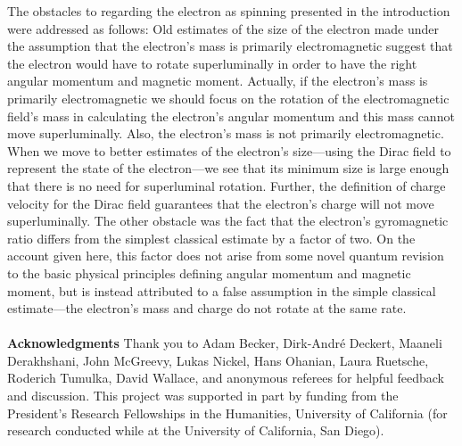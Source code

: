 \documentclass[12pt,secnumarabic,amsmath,amssymb,balancelastpage,nofootinbib]{article}
\begin{document}
The obstacles to regarding the electron as spinning presented in the introduction were addressed as follows:  Old estimates of the size of the electron made under the assumption that the electron's mass is primarily electromagnetic suggest that the electron would have to rotate superluminally in order to have the right angular momentum and magnetic moment.  Actually, if the electron's mass is primarily electromagnetic we should focus on the rotation of the electromagnetic field's mass in calculating the electron's angular momentum and this mass cannot move superluminally.  Also, the electron's mass is not primarily electromagnetic.  When we move to better estimates of the electron's size---using the Dirac field to represent the state of the electron---we see that its minimum size is large enough that there is no need for superluminal rotation.  Further, the definition of charge velocity for the Dirac field guarantees that the electron's charge will not move superluminally.  The other obstacle was the fact that the electron's gyromagnetic ratio differs from the simplest classical estimate by a factor of two.  On the account given here, this factor does not arise from some novel quantum revision to the basic physical principles defining angular momentum and magnetic moment, but is instead attributed to a false assumption in the simple classical estimate---the electron's mass and charge do not rotate at the same rate.\\\\


\textbf{Acknowledgments}
Thank you to Adam Becker, Dirk-Andr\'{e} Deckert, Maaneli Derakhshani, John McGreevy, Lukas Nickel, Hans Ohanian, Laura Ruetsche, Roderich Tumulka, David Wallace, and anonymous referees for helpful feedback and discussion.  This project was supported in part by funding from the President's Research Fellowships in the Humanities, University of California (for research conducted while at the University of California, San Diego).
\end{document}
